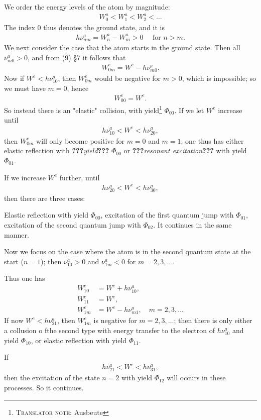 \documentclass[a4paper,11pt]{article}
\newcommand{\WTF}[1]{\textbf{???}\textit{#1}\textbf{???}}
\newcommand{\?}[2]{#1\footnote{\textsc{Translator note}: #2}}
\newcommand{\uequ}[1]{\begin{align*}#1\end{align*}}
\begin{document}
We order the energy levels of the atom by magnitude:
\uequ{
W_0^a < W_1^a < W_2^a < \dots
}
The index 0 thus denotes the ground state, and it is
\uequ{
h\nu_{nm}^a = W_n^a - W_m^a > 0 \quad \text{ for } n > m.
}
We next consider the case that the atom starts in the ground state. Then all $\nu_{m0}^a > 0$, and from (9) \S7 it follows that
\uequ{
W_{0m}^e = W^e - h\nu_{m0}^a.
}
Now if $W^e < h\nu_{10}^a$, then $W_{0m}^e$ would be negative for $m>0$, which is impossible; so we must have $m=0$, hence
\uequ{
W_{00}^e = W^e.
}
So instead there is an "elastic" collision, with \?{yield}{Ausbeute} $\Phi_{00}$. If we let $W^e$ increase until
\uequ{
h\nu_{10}^a < W^e < h\nu_{20}^a,
}
then $W_{0m}^e$ will only become positive for $m=0$ and $m=1$; one thus has either elastic reflection with \WTF{yield} $\Phi_{00}$ or \WTF{resonant excitation} with yield $\Phi_{01}$.

If we increase $W^e$ further, until
\uequ{
h\nu_{20}^a < W^e < h\nu_{30}^a,
}
then there are three cases:

Elastic reflection with yield $\Phi_{00}$, excitation of the first quantum jump with $\Phi_{01}$, excitation of the second quantum jump with $\Phi_{02}$. It continues in the same manner.

Now we focus on the case where the atom is in the second quantum state at the start ($n=1$); then $\nu_{10}^a > 0$ and $\nu_{1m}^a < 0$ for $m=2,3,\dots$.

Thus one has
\uequ{
W_{10}^e &= W^e + h\nu_{10}^a,\\
W_{11}^e &= W^e,\\
W_{1m}^e &= W^e - h\nu_{m1}^a, \quad m=2,3,\dots
}
If now $W^e < h\nu_{21}^a$, then $W_{1m}^e$ is negative for $m=2,3,\dots$; then there is only either  a collusion o fthe second type with energy transfer to the electron of $h\nu_{10}^a$ and yield $\Phi_{10}$, or elastic reflection with yield $\Phi_{11}$.

If
\uequ{
h\nu_{21}^a < W^e < h\nu_{31}^a,
}
then the excitation of the state $n=2$ with yield $\Phi_{12}$ will occurs in these processes. So it continues.
\end{document}
